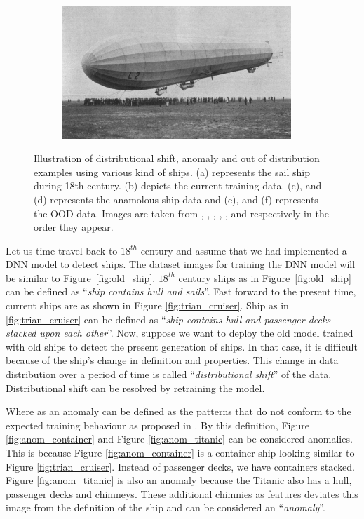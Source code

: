 \begin{figure}[h!]
\begin{subfigure}{0.333\textwidth}
        \centering
        \includegraphics[height=0.15\textheight,width=0.95\textwidth]{images/intro_ood_anomaly/ood_airship.jpg}
        \caption{}
        \label{fig:ood_airship}
    \end{subfigure}
    \caption{Illustration of distributional shift, anomaly and out of distribution examples using various kind of ships. (a) represents the sail ship during 18th century. (b) depicts the current training data.
    (c), and (d) represents the anamolous ship data and (e), and (f) represents the OOD data. Images are taken from \cite{old_ship}, \cite{train_cruiser}, \cite{container},
    \cite{titanic}, \cite{submarine}, and \cite{airship} respectively in the order they appear.}
\end{figure}

Let us time travel back to $18^{th}$ century and assume that we had implemented a DNN model to detect ships.
The dataset images for training the DNN model will be similar to Figure~\ref{fig:old_ship}.
$18^{th}$ century ships as in Figure~\ref{fig:old_ship} can be defined as ``\textit{ship contains hull and sails}''.
Fast forward to the present time, current ships are as shown in Figure \ref{fig:trian_cruiser}.
Ship as in \ref{fig:trian_cruiser} can be defined as ``\textit{ship contains hull and passenger decks stacked upon each other}''.
Now, suppose we want to deploy the old model trained with old ships to detect
the present generation of ships. In that case, it is difficult because of the ship’s change in definition and properties.
This change in data distribution over a period of time is called ``\textit{distributional shift}'' of the data.
Distributional shift can be resolved by retraining the model.

Where as an anomaly can be defined as the patterns that do not conform to the expected training behaviour as proposed in  \cite{anomaly_sec1_1}.
By this definition, Figure \ref{fig:anom_container} and Figure \ref{fig:anom_titanic} can be considered anomalies.
This is because Figure \ref{fig:anom_container} is a container ship looking similar to Figure \ref{fig:trian_cruiser}. Instead of passenger decks, we have containers stacked.
Figure \ref{fig:anom_titanic} is also an anomaly because the Titanic also has a hull, passenger decks
and chimneys. These additional chimnies as features deviates this image from the definition of the ship
and can be considered an ``\textit{anomaly}''.

